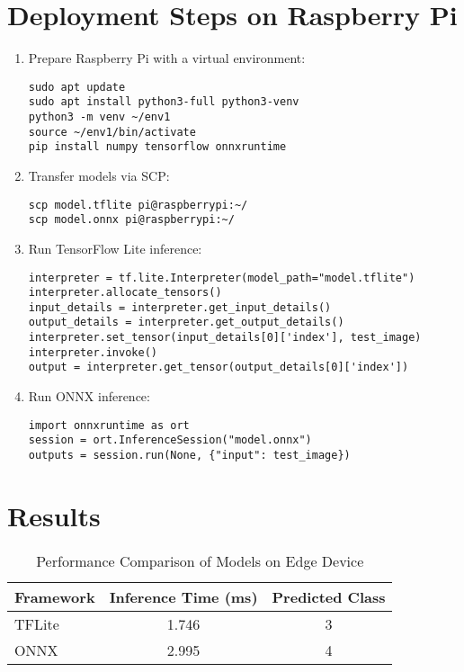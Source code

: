\documentclass[a4paper,12pt]{article}
\begin{document}
\section{Deployment Steps on Raspberry Pi}
\begin{enumerate}
    \item Prepare Raspberry Pi with a virtual environment:
    \begin{lstlisting}
sudo apt update
sudo apt install python3-full python3-venv
python3 -m venv ~/env1
source ~/env1/bin/activate
pip install numpy tensorflow onnxruntime
    \end{lstlisting}
    \item Transfer models via SCP:
    \begin{lstlisting}
scp model.tflite pi@raspberrypi:~/
scp model.onnx pi@raspberrypi:~/
    \end{lstlisting}
    \item Run TensorFlow Lite inference:
    \begin{lstlisting}
interpreter = tf.lite.Interpreter(model_path="model.tflite")
interpreter.allocate_tensors()
input_details = interpreter.get_input_details()
output_details = interpreter.get_output_details()
interpreter.set_tensor(input_details[0]['index'], test_image)
interpreter.invoke()
output = interpreter.get_tensor(output_details[0]['index'])
    \end{lstlisting}
    \item Run ONNX inference:
    \begin{lstlisting}
import onnxruntime as ort
session = ort.InferenceSession("model.onnx")
outputs = session.run(None, {"input": test_image})
    \end{lstlisting}
\end{enumerate}

\section{Results}

\begin{table}[h]
\centering
\begin{tabular}{|l|c|c|}
\hline
\textbf{Framework} & \textbf{Inference Time (ms)} & \textbf{Predicted Class} \\
\hline
TFLite         & 1.746                  & 3                        \\
ONNX            & 2.995                  & 4                       \\
\hline
\end{tabular}
\caption{Performance Comparison of Models on Edge Device}
\end{table}
\end{document}
